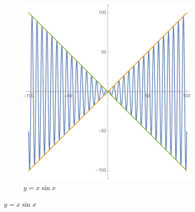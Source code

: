 \begin{figure}[h]
	\centering
	\begin{subfigure}[t]{0.45\textwidth}
		\centering
		\includegraphics[width=\textwidth]{./images/Ch01/xsinx.pdf}
		\caption{$y=x\sin x$}
	\end{subfigure}


\end{figure}
